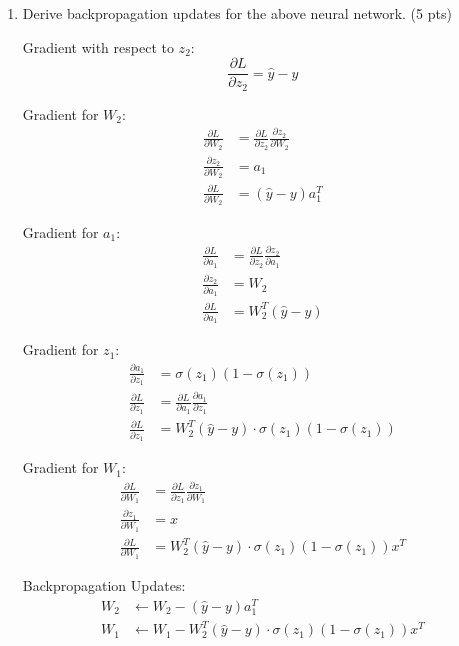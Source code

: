 \documentclass[a4paper]{article}
\theoremstyle{definition}
\newenvironment{soln}{
    \leavevmode\color{blue}\ignorespaces
}{}
\begin{document}
\begin{enumerate}
    \item Derive backpropagation updates for the above neural network. (5 pts) \\
    \begin{soln}

        
    Gradient with respect to \( z_2 \):
    \begin{equation}
    \frac{\partial L}{\partial z_2} = \hat{y} - y
    \end{equation}

    Gradient for \( W_2 \):
    \begin{align*}
    \frac{\partial L}{\partial W_2} &= \frac{\partial L}{\partial z_2} \frac{\partial z_2}{\partial W_2} \\
    \frac{\partial z_2}{\partial W_2} &= a_1 \\
    \frac{\partial L}{\partial W_2} &= (\hat{y} - y) a_1^T
    \end{align*}

    Gradient for \( a_1 \):
    \begin{align*}
    \frac{\partial L}{\partial a_1} &= \frac{\partial L}{\partial z_2} \frac{\partial z_2}{\partial a_1} \\
    \frac{\partial z_2}{\partial a_1} &= W_2 \\
    \frac{\partial L}{\partial a_1} &= W_2^T (\hat{y} - y)
    \end{align*}

    Gradient for \( z_1 \):
    \begin{align*}
    \frac{\partial a_1}{\partial z_1} &= \sigma(z_1) (1 - \sigma(z_1)) \\
    \frac{\partial L}{\partial z_1} &= \frac{\partial L}{\partial a_1} \frac{\partial a_1}{\partial z_1} \\
    \frac{\partial L}{\partial z_1} &= W_2^T (\hat{y} - y) \cdot \sigma(z_1) (1 - \sigma(z_1))
    \end{align*}

    Gradient for \( W_1 \):
    \begin{align*}
    \frac{\partial L}{\partial W_1} &= \frac{\partial L}{\partial z_1} \frac{\partial z_1}{\partial W_1} \\
    \frac{\partial z_1}{\partial W_1} &= x \\
    \frac{\partial L}{\partial W_1} &= W_2^T (\hat{y} - y) \cdot \sigma(z_1) (1 - \sigma(z_1)) x^T
    \end{align*}

    Backpropagation Updates:
    \begin{align*}
    W_2 &\leftarrow W_2 - (\hat{y} - y) a_1^T \\
    W_1 &\leftarrow W_1 - W_2^T (\hat{y} - y) \cdot \sigma(z_1) (1 - \sigma(z_1)) x^T
    \end{align*}


\end{soln}
\end{enumerate}
\end{document}
